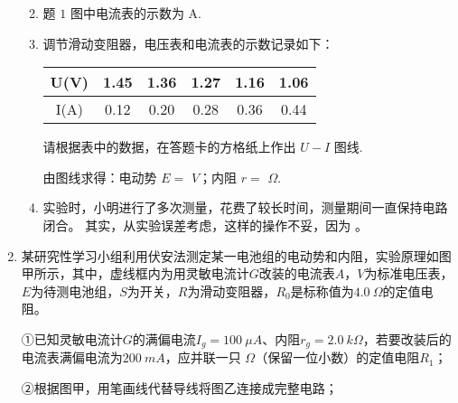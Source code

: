 \begin{enumerate}[leftmargin=0em]
\begin{enumerate}
\renewcommand{\labelenumii}{(\arabic{enumii})}
\item 
题 $ 1 $ 图中电流表的示数为  
A.


\item 
调节滑动变阻器，电压表和电流表的示数记录如下：
\begin{table}[h!]
\centering 
\begin{tabular}{|c|c|c|c|c|c|}
\hline 
U(V) & 1.45 & 1.36 & 1.27 & 1.16 & 1.06
 \\
\hline
I(A) & 0.12 & 0.20 & 0.28 & 0.36 & 0.44\\ 
\hline 
\end{tabular}
\end{table} 



请根据表中的数据，在答题卡的方格纸上作出 $ U-I $ 图线.

由图线求得：电动势 $ E = $  
$ V $；内阻 $ r = $  
$ \Omega $.


\item 
实验时，小明进行了多次测量，花费了较长时间，测量期间一直保持电路闭合。 其实，从实验误差考虑，这样的操作不妥，因为  
。




\end{enumerate}




\newpage

\item 
{}
某研究性学习小组利用伏安法测定某一电池组的电动势和内阻，实验原理如图甲所示，其中，虚线框内为用灵敏电流计$ G $改装的电流表$ A $，$ V $为标准电压表，$ E $为待测电池组，$ S $为开关，$ R $为滑动变阻器，$ R_{0} $是标称值为$ 4.0 \ \Omega $的定值电阻。
\begin{figure}[h!]
\centering

\end{figure}


①已知灵敏电流计$ G $的满偏电流$ I_{g} =100 \ \mu A $、内阻$ r_g=2.0 \ k\Omega $，若要改装后的电流表满偏电流为$ 200 \ mA $，应并联一只  
$ \Omega $（保留一位小数）的定值电阻$ R_{1} $；

②根据图甲，用笔画线代替导线将图乙连接成完整电路；


\end{enumerate}
